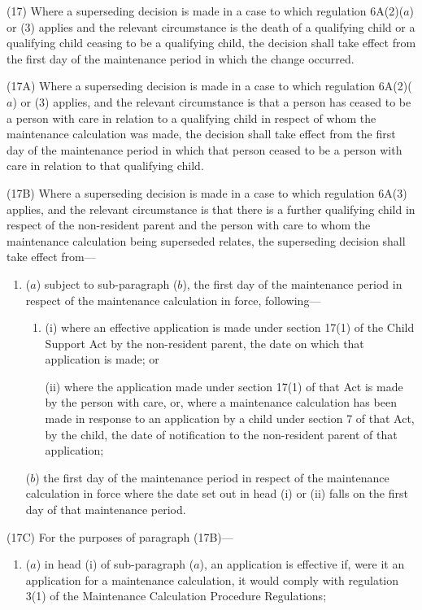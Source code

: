 \documentclass[12pt,a4paper]{article}
\begin{document}
{(17) Where a superseding decision is made in a case to which regulation 6A(2)($a$)  or (3) applies and the relevant circumstance is the death of a qualifying child or a qualifying child ceasing to be a qualifying child, the decision shall take effect from the first day of the maintenance period in which the change occurred.

(17A) Where a superseding decision is made in a case to which regulation 6A(2)($a$)  or (3) applies, and the relevant circumstance is that a person has ceased to be a person with care in relation to a qualifying child in respect of whom the maintenance calculation was made, the decision shall take effect from the first day of the maintenance period in which that person ceased to be a person with care in relation to that qualifying child.

(17B) Where a superseding decision is made in a case to which regulation 6A(3) applies, and the relevant circumstance is that there is a further qualifying child in respect of the non-resident parent and the person with care to whom the maintenance calculation being superseded relates, the superseding decision shall take effect from—
\begin{enumerate}\item[]
($a$) subject to sub-paragraph ($b$), the first day of the maintenance period in respect of the maintenance calculation in force, following—
\begin{enumerate}\item[]
(i) where an effective application is made under section 17(1) of the Child Support Act by the non-resident parent, the date on which that application is made; or

(ii) where the application made under section 17(1) of that Act is made by the person with care, or, where a maintenance calculation has been made in response to an application by a child under section 7 of that Act, by the child, the date of notification to the non-resident parent of that application;
\end{enumerate}

($b$) the first day of the maintenance period in respect of the maintenance calculation in force where the date set out in head (i)  or (ii)  falls on the first day of that maintenance period.
\end{enumerate}

(17C) For the purposes of paragraph (17B)—
\begin{enumerate}\item[]
($a$) in head (i)  of sub-paragraph ($a$), an application is effective if, were it an application for a maintenance calculation, it would comply with regulation 3(1) of the Maintenance Calculation Procedure Regulations;


\end{enumerate}}
\end{document}
